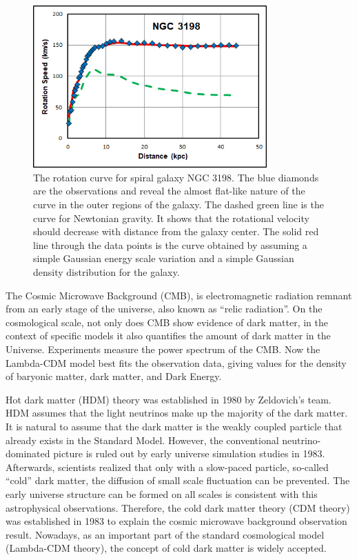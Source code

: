 \begin{figure}[htbp]
    \centering
    \includegraphics[width=0.8\textwidth]{chapters/c2/figures/ngc3198_sparc.jpg}
    \caption{The rotation curve for spiral galaxy NGC 3198. The blue diamonds are the observations and reveal the almost flat-like nature of the curve in the outer regions of the galaxy. The dashed green line is the curve for Newtonian gravity. It shows that the rotational velocity should decrease with distance from the galaxy center. The solid red line through the data points is the curve obtained by assuming a simple Gaussian energy scale variation and a simple Gaussian density distribution for the galaxy.}
    \label{fig:rotation}
\end{figure}

\par The Cosmic Microwave Background (CMB), is electromagnetic radiation remnant from an early stage of the universe, also known as ``relic radiation''. On the cosmological scale, not only does CMB show evidence of dark matter, in the context of specific models it also quantifies the amount of dark matter in the Universe. Experiments measure the power spectrum of the CMB. Now the Lambda-CDM model best fits the observation data, giving values for the density of baryonic matter, dark matter, and Dark Energy.

\par Hot dark matter (HDM) theory\cite{Zeldovich:1982zz} was established in 1980 by Zeldovich's team. HDM assumes that the light neutrinos make up the majority of the dark matter. It is natural to assume that the dark matter is the weakly coupled particle that already exists in the Standard Model. However, the conventional neutrino-dominated picture is ruled out by early universe simulation studies in 1983\cite{White:1984yj}. Afterwards, scientists realized that only with a slow-paced particle, so-called ``cold'' dark matter, the diffusion of small scale fluctuation can be prevented. The early universe structure can be formed on all scales is consistent with this astrophysical observations. Therefore, the cold dark matter theory (CDM theory)\cite{PhysRevLett.48.223} was established in 1983 to explain the cosmic microwave background observation result. Nowadays, as an important part of the standard cosmological model (Lambda-CDM theory), the concept of cold dark matter is widely accepted. 

